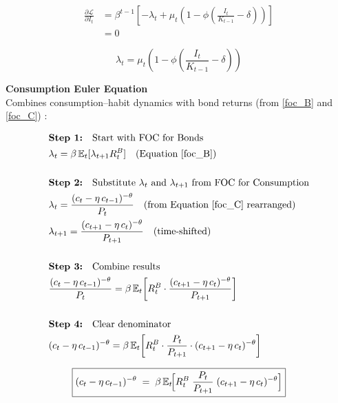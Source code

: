 \documentclass[11pt,preprint]{elsarticle}
\numberwithin{equation}{section}
\numberwithin{figure}{section}
\numberwithin{table}{section}
\begin{document}
\begin{align*}
\frac{\partial \mathcal{L}}{\partial I_t}
&= \beta^{t-1} \left[ 
   -\lambda_t 
   + \mu_t \left( 
        1 
        - \phi \left( \frac{I_t}{K_{t-1}} - \delta \right) 
     \right)
\right] \\
&= 0
\end{align*}

\begin{equation}\label{foc_I}
\boxed{
  \lambda_t 
  = \mu_t 
    \left( 1 
      - \phi 
        \left( \frac{I_t}{K_{t-1}} - \delta \right)
    \right)
}
\end{equation}

\newpage

\textbf{Consumption Euler Equation}\\
Combines consumption--habit dynamics with bond returns (from
\eqref{foc_B} and \eqref{foc_C}) :

\begin{align*}
& \textbf{Step 1:} \quad \text{Start with FOC for Bonds} \\
& \lambda_t = \beta\,\mathbb{E}_t[\lambda_{t+1}R_t^B] \quad \text{(Equation \ref{foc_B})} \\
& \\
& \textbf{Step 2:} \quad \text{Substitute } \lambda_t \text{ and } \lambda_{t+1} \text{ from FOC for Consumption} \\
& \lambda_t = \frac{(c_t - \eta\,c_{t-1})^{-\theta}}{P_t} \quad \text{(from Equation \ref{foc_C} rearranged)} \\
& \lambda_{t+1} = \frac{(c_{t+1} - \eta\,c_t)^{-\theta}}{P_{t+1}} \quad \text{(time-shifted)} \\
& \\
& \textbf{Step 3:} \quad \text{Combine results} \\
& \frac{(c_t - \eta\,c_{t-1})^{-\theta}}{P_t} = \beta\,\mathbb{E}_t\!\left[ R_t^B \cdot \frac{(c_{t+1} - \eta\,c_t)^{-\theta}}{P_{t+1}} \right] \\
& \\
& \textbf{Step 4:} \quad \text{Clear denominator} \\
& (c_t - \eta\,c_{t-1})^{-\theta} = \beta\,\mathbb{E}_t\!\left[ R_t^B \cdot \frac{P_t}{P_{t+1}} \cdot (c_{t+1} - \eta\,c_t)^{-\theta} \right]
\end{align*}

\begin{equation}\label{consEuler_app}
\boxed{%
  (c_t - \eta\,c_{t-1})^{-\theta}
  \;=\;
  \beta\,\mathbb{E}_t\!\Bigl[
    R_t^B \;\frac{P_t}{P_{t+1}}\;(c_{t+1} - \eta\,c_t)^{-\theta}
  \Bigr]
}
\end{equation}
\end{document}
